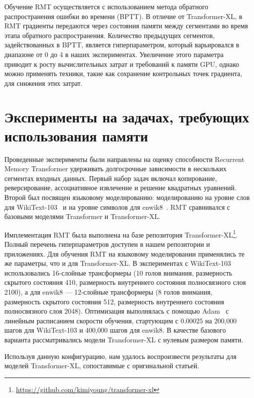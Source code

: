 Обучение RMT осуществляется с использованием метода обратного распространения ошибки во времени (BPTT). В отличие от Transformer-XL, в RMT градиенты передаются через состояния памяти между сегментами во время этапа обратного распространения. Количество предыдущих сегментов, задействованных в BPTT, является гиперпараметром, который варьировался в диапазоне от 0 до 4 в наших экспериментах. Увеличение этого параметра приводит к росту вычислительных затрат и требований к памяти GPU, однако можно применять техники, такие как сохранение контрольных точек градиента, для снижения этих затрат.


\section{Эксперименты на задачах, требующих использования памяти}

\label{sec:experiments}

Проведенные эксперименты были направлены на оценку способности Recurrent Memory Transformer удерживать долгосрочные зависимости в нескольких сегментах входных данных. Первый набор задач включал копирование, реверсирование, ассоциативное извлечение и решение квадратных уравнений. Второй был посвящен языковому моделированию: моделированию на уровне слов для WikiText-103~\cite{merity2017wikitext} и на уровне символов для enwik8~\cite{enwik8}. RMT сравнивался с базовыми моделями Transformer и Transformer-XL.

Имплементация
 RMT была выполнена на базе репозитория Transformer-XL\footnote{\url{https://github.com/kimiyoung/transformer-xl}}. Полный перечень гиперпараметров доступен в нашем репозитории и приложениях. Для обучения RMT на языковому моделировании применялись те же параметры, что и для Transformer-XL. В экспериментах с WikiText-103 использовались 16-слойные трансформеры (10 голов внимания, размерность скрытого состояния 410, размерность внутреннего состояния полносвязного слоя 2100), а для enwik8 — 12-слойные трансформеры (8 голов внимания, размерность скрытого состояния 512, размерность внутреннего состояния полносвязного слоя 2048). Оптимизация выполнялась с помощью Adam~\cite{adam} с линейным расписанием скорости обучения, стартующим с $0.00025$ на 200,000 шагов для WikiText-103 и 400,000 шагов для enwik8. В качестве базового варианта рассматривались модели Transformer-XL с нулевым размером памяти.

Используя данную конфигурацию, нам удалось воспроизвести результаты для моделей Transformer-XL, сопоставимые с оригинальной статьей.



